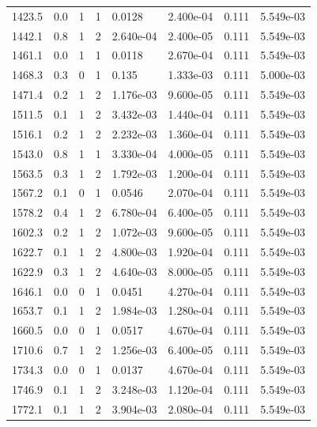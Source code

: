 \documentclass[preview]{standalone}
\begin{document}
{{{{\begin{tabular}{L{1.2cm}C{1.2cm} C{0.3cm}C{0.5cm} C{1.4cm}C{1.4cm} C{1.4cm}C{1.4cm}}
  1423.5  &   0.0  & 1     &  1 &  0.0128  & 2.400e-04  & 0.111 &  5.549e-03   \\ 
  1442.1  &   0.8  & 1     &  2 &  2.640e-04  & 2.400e-05  & 0.111 &  5.549e-03   \\ 
  1461.1  &   0.0  & 1     &  1 &  0.0118  & 2.670e-04  & 0.111 &  5.549e-03   \\ 
  1468.3  &   0.3  & 0     &  1 &  0.135  & 1.333e-03  & 0.111 &  5.000e-03   \\ 
  1471.4  &   0.2  & 1     &  2 &  1.176e-03  & 9.600e-05  & 0.111 &  5.549e-03   \\ 
  1511.5  &   0.1  & 1     &  2 &  3.432e-03  & 1.440e-04  & 0.111 &  5.549e-03   \\ 
  1516.1  &   0.2  & 1     &  2 &  2.232e-03  & 1.360e-04  & 0.111 &  5.549e-03   \\ 
  1543.0  &   0.8  & 1     &  1 &  3.330e-04  & 4.000e-05  & 0.111 &  5.549e-03   \\ 
  1563.5  &   0.3  & 1     &  2 &  1.792e-03  & 1.200e-04  & 0.111 &  5.549e-03   \\ 
  1567.2  &   0.1  & 0     &  1 &  0.0546  & 2.070e-04  & 0.111 &  5.549e-03   \\ 
  1578.2  &   0.4  & 1     &  2 &  6.780e-04  & 6.400e-05  & 0.111 &  5.549e-03   \\ 
  1602.3  &   0.2  & 1     &  2 &  1.072e-03  & 9.600e-05  & 0.111 &  5.549e-03   \\ 
  1622.7  &   0.1  & 1     &  2 &  4.800e-03  & 1.920e-04  & 0.111 &  5.549e-03   \\ 
  1622.9  &   0.3  & 1     &  2 &  4.640e-03  & 8.000e-05  & 0.111 &  5.549e-03   \\ 
  1646.1  &   0.0  & 0     &  1 &  0.0451  & 4.270e-04  & 0.111 &  5.549e-03   \\ 
  1653.7  &   0.1  & 1     &  2 &  1.984e-03  & 1.280e-04  & 0.111 &  5.549e-03   \\ 
  1660.5  &   0.0  & 0     &  1 &  0.0517  & 4.670e-04  & 0.111 &  5.549e-03   \\ 
  1710.6  &   0.7  & 1     &  2 &  1.256e-03  & 6.400e-05  & 0.111 &  5.549e-03   \\ 
  1734.3  &   0.0  & 0     &  1 &  0.0137  & 4.670e-04  & 0.111 &  5.549e-03   \\ 
  1746.9  &   0.1  & 1     &  2 &  3.248e-03  & 1.120e-04  & 0.111 &  5.549e-03   \\ 
  1772.1  &   0.1  & 1     &  2 &  3.904e-03  & 2.080e-04  & 0.111 &  5.549e-03   \\ 

\end{tabular}}}}}
\end{document}
